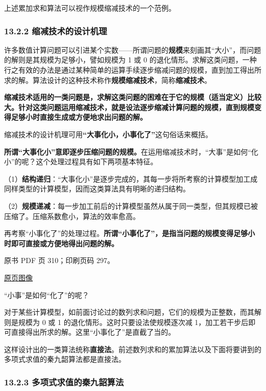 上述累加求和算法可以视作规模缩减技术的一个范例。

\subsubsection{13.2.2 缩减技术的设计机理}\label{ch13-ux7f29ux51cfux6280ux672fux7684ux8bbeux8ba1ux673aux7406}

许多数值计算问题可以引进某个实数------所谓问题的\textbf{规模}来刻画其``大小''，而问题的解则是其规模为足够小，譬如规模为 1 或 0 的退化情形。求解这类问题，一种行之有效的办法是通过某种简单的运算手续逐步缩减问题的规模，直到加工得出所求的解。算法设计的这种技术称作\textbf{规模缩减技术}，简称\textbf{缩减技术}。

\textbf{缩减技术适用的一类问题是，求解这类问题的困难在于它的规模（适当定义）比较大。针对这类问题运用缩减技术，就是设法逐步缩减计算问题的规模，直到规模变得足够小时直接生成或方便地求出问题的解。}

缩减技术的设计机理可用\textbf{``大事化小，小事化了''}这句俗话来概括。

\textbf{所谓``大事化小''意即逐步压缩问题的规模。}在运用缩减技术时，``大事''是如何``化小''的呢？这个处理过程具有如下两项基本特征。

（1）\textbf{结构递归}：``大事化小''是逐步完成的，其每一步将所考察的计算模型加工成同样类型的计算模型，因而这类算法具有明晰的递归结构。

（2）\textbf{规模递减}：每一步加工前后的计算模型虽然从属于同一类型，但其规模已被压缩了。压缩系数愈小，算法的效率愈高。

再考察``小事化了''的处理过程。\textbf{所谓``小事化了''，是指当问题的规模变得足够小时即可直接或方便地得出问题的解。}

\clearpage

原书 PDF 页 310；印刷页码 297。

\href{source-images/pdf-310.jpeg}{原页图像}

``小事''是如何``化了''的呢？

对于某些计算模型，如前面讨论过的数列求和问题，它们的规模为正整数，而其解则是规模为 0 或 1 的退化情形。这时只要设法使规模逐次减 1，加工若干步后即可直接得出所求的解。这里``小事化了''是直截了当的。

这样设计出的一类算法统称\textbf{直接法}。前述数列求和的累加算法以及下面将要讲到的多项式求值的秦九韶算法都是直接法。

\subsubsection{13.2.3 多项式求值的秦九韶算法}\label{ch13-ux591aux9879ux5f0fux6c42ux503cux7684ux79e6ux4e5dux97f6ux7b97ux6cd5}

